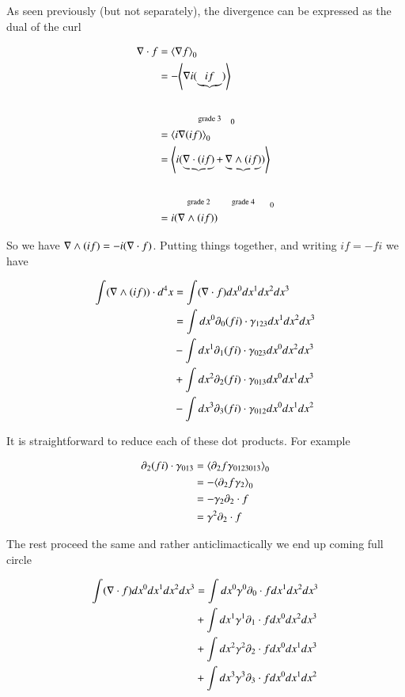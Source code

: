 As seen previously (but not separately), the divergence can be expressed as the dual of the curl

\begin{align*}
\nabla \cdot f
&=
{\left\langle{{ \nabla f }}\right\rangle}_{0} \\
&=
-{\left\langle{{ \nabla i (\underbrace{i f}_{\text{grade 3}}) }}\right\rangle}_{0} \\
&=
{\left\langle{{ i \nabla(i f) }}\right\rangle}_{0} \\
&=
{\left\langle{{ i ( \underbrace{\nabla\cdot (i f)}_{\text{grade 2}} + \underbrace{\nabla\wedge (i f)}_{\text{grade 4}} ) }}\right\rangle}_{0} \\
&=
i (\nabla \wedge (i f)) \\
\end{align*}

So we have $\nabla \wedge (i f) = -i (\nabla \cdot f)$.  Putting things together, and writing $i f = -f i$ we have 

\begin{align*}
\int (\nabla \wedge (i f)) \cdot d^4 x
&= 
\int (\nabla \cdot f) dx^0 dx^1 dx^2 dx^3 \\
&=
\int dx^0 \partial_0 (f i) \cdot \gamma_{123} dx^1 dx^2 dx^3 \\
&-\int dx^1 \partial_1 (f i) \cdot \gamma_{023} dx^0 dx^2 dx^3 \\
&+\int dx^2 \partial_2 (f i) \cdot \gamma_{013} dx^0 dx^1 dx^3 \\
&-\int dx^3 \partial_3 (f i) \cdot \gamma_{012} dx^0 dx^1 dx^2 \\
\end{align*}

It is straightforward to reduce each of these dot products.  For example

\begin{align*}
\partial_2 (f i) \cdot \gamma_{013}
&=
{\left\langle{{ \partial_2 f \gamma_{0123013} }}\right\rangle}_{0} \\
&=
-{\left\langle{{ \partial_2 f \gamma_{2} }}\right\rangle}_{0} \\
&=
- \gamma_2 \partial_2 \cdot f \\
&=
\gamma^2 \partial_2 \cdot f 
\end{align*}

The rest proceed the same and rather anticlimactically we end up coming full circle 

\begin{align*}
\int (\nabla \cdot f) dx^0 dx^1 dx^2 dx^3 
&=
\int dx^0 \gamma^0 \partial_0 \cdot f dx^1 dx^2 dx^3 \\
&+\int dx^1 \gamma^1 \partial_1 \cdot f dx^0 dx^2 dx^3 \\
&+\int dx^2 \gamma^2 \partial_2 \cdot f dx^0 dx^1 dx^3 \\
&+\int dx^3 \gamma^3 \partial_3 \cdot f dx^0 dx^1 dx^2 \\
\end{align*}

